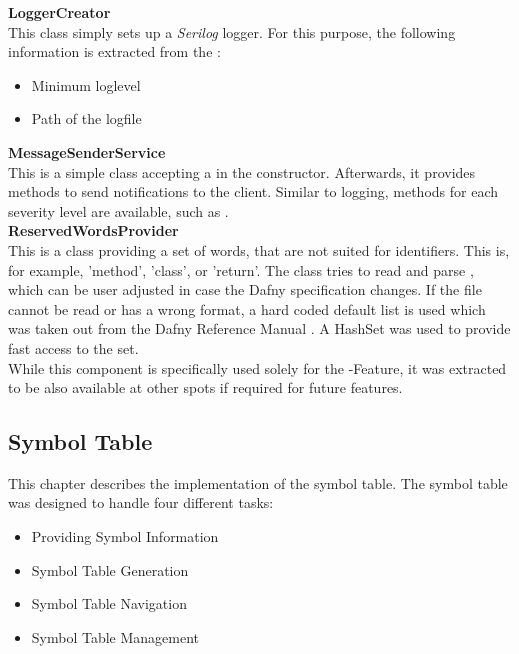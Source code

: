 \textbf{LoggerCreator}\\
This class simply sets up a \textit{Serilog} \cite{serilog} logger.
For this purpose, the following information is extracted from the :
\begin{itemize}
    \item Minimum loglevel
    \item Path of the logfile
\end{itemize}

\textbf{MessageSenderService}\\
This is a simple class accepting a  in the constructor.
Afterwards, it provides methods to send notifications to the client.
Similar to logging, methods for each severity level are available, such as .\\

\textbf{ReservedWordsProvider}\\
This is a class providing a set of words, that are not suited for identifiers.
This is, for example, 'method', 'class', or 'return'.
The class tries to read and parse , which can be user adjusted in case the Dafny specification changes.
If the file cannot be read or has a wrong format, a hard coded default list is used which was taken out from the Dafny Reference Manual \cite{dafnyReferenceManual}.
A HashSet was used to provide fast access to the set.\\

While this component is specifically used solely for the -Feature, it was extracted to be also available at other spots if required for future features.











\subsection{Symbol Table}
This chapter describes the implementation of the symbol table.
The symbol table was designed to handle four different tasks:

\begin{itemize}
    \item Providing Symbol Information
    \item Symbol Table Generation
    \item Symbol Table Navigation
    \item Symbol Table Management
\end{itemize}

